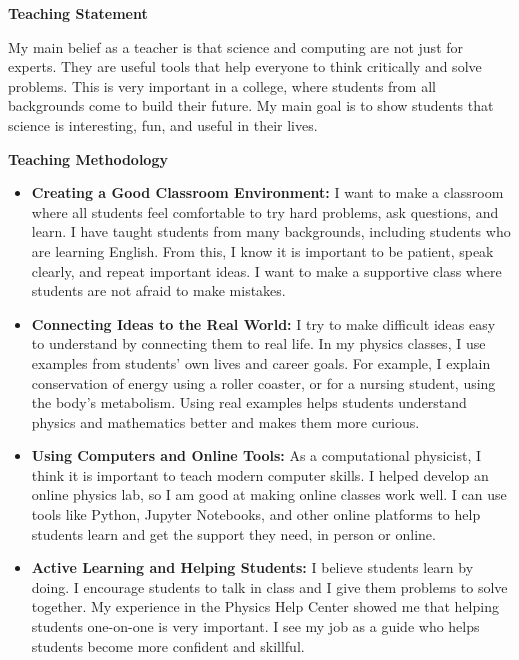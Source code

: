 \documentclass[letter,11pt]{article}
\begin{document}
\vspace{8mm}

\begin{center}
    \Large \textbf{Teaching Statement}
\end{center}
\vspace{5mm}

My main belief as a teacher is that science and computing are 
not just for experts. They are useful tools that help everyone 
to think critically and solve problems. This is very important 
in a college, where students from all backgrounds come to build 
their future. My main goal is to show students that science is 
interesting, fun, and useful in their lives.

\vspace{4mm}
\noindent\textbf{Teaching Methodology}
\begin{itemize}
    \item \textbf{Creating a Good Classroom Environment:} I want to 
    make a classroom where all students feel comfortable to try 
    hard problems, ask questions, and learn. I have taught students 
    from many backgrounds, including students who are learning English. 
    From this, I know it is important to be patient, speak clearly, 
    and repeat important ideas. I want to make a supportive class where 
    students are not afraid to make mistakes.

    \item \textbf{Connecting Ideas to the Real World:} I try to make 
    difficult ideas easy to understand by connecting them to real life. 
    In my physics classes, I use examples from students' own lives and 
    career goals. For example, I explain conservation of energy using a 
    roller coaster, or for a nursing student, using the body's metabolism. 
    Using real examples helps students understand physics and mathematics better 
    and makes them more curious.

    \item \textbf{Using Computers and Online Tools:} As a computational 
    physicist, I think it is important to teach modern computer skills. 
    I helped develop an online physics lab, so I am good at making 
    online classes work well. I can use tools like Python, Jupyter Notebooks, 
    and other online platforms to help students learn and get the support 
    they need, in person or online.

    \item \textbf{Active Learning and Helping Students:} I believe students 
    learn by doing. I encourage students to talk in class and I give them 
    problems to solve together. My experience in the Physics Help Center 
    showed me that helping students one-on-one is very important. I see my 
    job as a guide who helps students become more confident and skillful.
\end{itemize}
\end{document}
